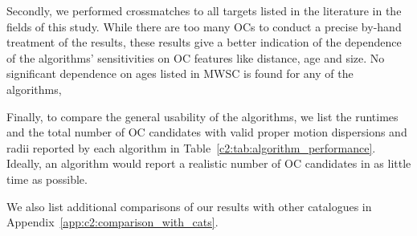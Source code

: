 Secondly, we performed crossmatches to all targets listed in the literature in the fields of this study. While there are too many OCs to conduct a precise by-hand treatment of the results, these results give a better indication of the dependence of the algorithms' sensitivities on OC features like distance, age and size. No significant dependence on ages listed in MWSC is found for any of the algorithms, 

Finally, to compare the general usability of the algorithms, we list the runtimes and the total number of OC candidates with valid proper motion dispersions and radii reported by each algorithm in Table~\ref{c2:tab:algorithm_performance}. Ideally, an algorithm would report a realistic number of OC candidates in as little time as possible.

We also list additional comparisons of our results with other catalogues in Appendix~\ref{app:c2:comparison_with_cats}. 


